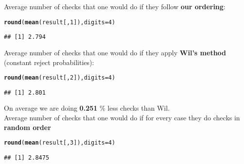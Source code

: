 \documentclass{article}\usepackage[]{graphicx}\usepackage[]{color}
\makeatletter
\newcommand{\hlnum}[1]{\textcolor[rgb]{0.686,0.059,0.569}{#1}}%
\newcommand{\hlstd}[1]{\textcolor[rgb]{0.345,0.345,0.345}{#1}}%
\newcommand{\hlkwc}[1]{\textcolor[rgb]{0.333,0.667,0.333}{#1}}%
\newcommand{\hlkwd}[1]{\textcolor[rgb]{0.737,0.353,0.396}{\textbf{#1}}}%
\newenvironment{kframe}{%
 \def\at@end@of@kframe{}%
 \ifinner\ifhmode%
  \def\at@end@of@kframe{\end{minipage}}%
  \begin{minipage}{\columnwidth}%
 \fi\fi%
 \def\FrameCommand##1{\hskip\@totalleftmargin \hskip-\fboxsep
 \colorbox{shadecolor}{##1}\hskip-\fboxsep
     \hskip-\linewidth \hskip-\@totalleftmargin \hskip\columnwidth}%
 \MakeFramed {\advance\hsize-\width
   \@totalleftmargin\z@ \linewidth\hsize
   \@setminipage}}%
 {\par\unskip\endMakeFramed%
 \at@end@of@kframe}
\newenvironment{knitrout}{}{} %
\makeatother
\begin{document}
Average number of checks that one would do if they follow \textbf{our ordering}:

\begin{knitrout}
\color{fgcolor}\begin{kframe}
\begin{alltt}
\hlkwd{round}\hlstd{(}\hlkwd{mean}\hlstd{(result[,}\hlnum{1}\hlstd{]),}\hlkwc{digits} \hlstd{=} \hlnum{4}\hlstd{)}
\end{alltt}
\begin{verbatim}
## [1] 2.794
\end{verbatim}
\end{kframe}
\end{knitrout}

Average number of checks that one would do if they apply \textbf{Wil's method} (constant reject probabilities):

\begin{knitrout}
\color{fgcolor}\begin{kframe}
\begin{alltt}
\hlkwd{round}\hlstd{(}\hlkwd{mean}\hlstd{(result[,}\hlnum{2}\hlstd{]),}\hlkwc{digits} \hlstd{=} \hlnum{4}\hlstd{)}
\end{alltt}
\begin{verbatim}
## [1] 2.801
\end{verbatim}
\end{kframe}
\end{knitrout}


 
On average we are doing \textbf{0.251} \% less checks than Wil. \\

Average number of checks that one would do if for every case they do checks in \textbf{random order}

\begin{knitrout}
\color{fgcolor}\begin{kframe}
\begin{alltt}
\hlkwd{round}\hlstd{(}\hlkwd{mean}\hlstd{(result[,}\hlnum{3}\hlstd{]),}\hlkwc{digits} \hlstd{=} \hlnum{4}\hlstd{)}
\end{alltt}
\begin{verbatim}
## [1] 2.8475
\end{verbatim}
\end{kframe}
\end{knitrout}
\end{document}
